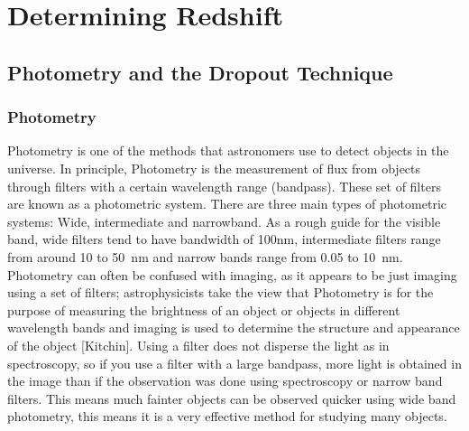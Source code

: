 
\section{Determining Redshift} %
	\subsection{Photometry and the Dropout Technique} %
		\label{ssub:filters_and_the_dropout_technique}

		\subsubsection{Photometry} %
		\label{ssub:photometry}
			Photometry is one of the methods that astronomers use to detect objects in the universe. In principle, Photometry is the measurement of flux from objects through filters with a certain wavelength range (bandpass). These set of filters are known as a photometric system. There are three main types of photometric systems: Wide, intermediate and narrowband. As a rough guide for the visible band, wide filters tend to have bandwidth of 100nm, intermediate filters range from around 10 to \SI{50}{\nano\metre} and narrow bands range from 0.05 to \SI{10}{\nano\metre}\cite{kitchin}. Photometry can often be confused with imaging, as it appears to be just imaging using a set of filters; astrophysicists take the view that Photometry is for the purpose of measuring the brightness of an object or objects in different wavelength bands and imaging is used to determine the structure and appearance of the object [Kitchin]. Using a filter does not disperse the light as in spectroscopy, so if you use a filter with a large bandpass, more light is obtained in the image than if the observation was done using spectroscopy or narrow band filters. This means much fainter objects can be observed quicker using wide band photometry, this means it is a very effective method for studying many objects\cite{Romanishin}.

